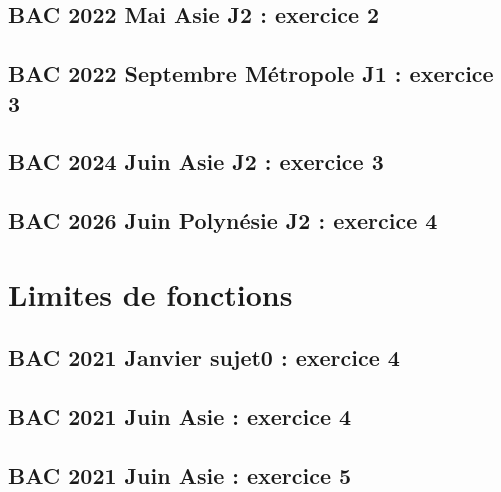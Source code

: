\documentclass[lang=fr,edition=teacher,layout=sheet]{mxbook}
\begin{document}
\par\bigskip
{}\subsection*{BAC 2022 Mai Asie J2 : exercice 2}
\begingroup\endgroup
\par\bigskip
{}\subsection*{BAC 2022 Septembre Métropole J1 : exercice 3}
\begingroup\endgroup
\par\bigskip
{}\subsection*{BAC 2024 Juin Asie J2 : exercice 3}
\begingroup\endgroup
\par\bigskip
{}\subsection*{BAC 2026 Juin Polynésie J2 : exercice 4}
\begingroup\endgroup
\par\bigskip
\clearpage\section*{Limites de fonctions}
\subsection*{BAC 2021 Janvier sujet0 : exercice 4}
\begingroup\endgroup
\par\bigskip
{}\subsection*{BAC 2021 Juin Asie : exercice 4}
\begingroup\endgroup
\par\bigskip
{}\subsection*{BAC 2021 Juin Asie : exercice 5}
\end{document}
